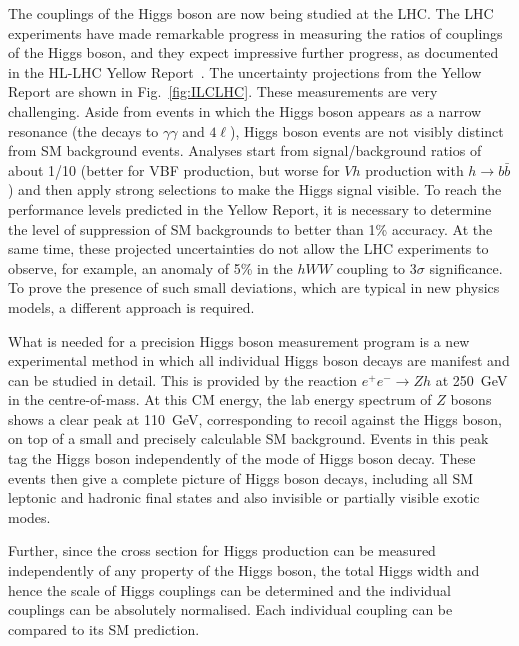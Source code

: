 \documentclass[%
 reprint,
 amsmath,amssymb,
 aps,
]{revtex4-1}
\def\ee{e^+e^-}
\begin{document}
The couplings of the Higgs boson are now being studied at the LHC.
The LHC experiments have made remarkable progress in measuring the ratios of
couplings of the Higgs boson, and they expect impressive further progress, as
documented in the HL-LHC Yellow Report~\cite{Yellow}.  The uncertainty
projections
from the Yellow Report  are shown in Fig.~\ref{fig:ILCLHC}.   These
measurements are very challenging.   Aside from events in
which the Higgs boson appears as a narrow resonance (the decays to
$\gamma\gamma$ and $4\ell$), Higgs boson events are not visibly
distinct from SM background events.  Analyses start from
signal/background ratios of about  1/10  (better for VBF production,
but 
worse for $Vh$ production with $h\to b\bar b$) and then apply strong
selections to make the Higgs signal visible.   To reach the
performance levels predicted in  the Yellow Report, it is necessary to
determine the level of suppression of SM backgrounds to better than
 1\% accuracy.  At
the same time, these projected uncertainties do not allow the LHC experiments to
observe, for example, an anomaly of 5\% in the $hWW$ coupling to
3$\sigma$ significance.   To prove the presence of such small
deviations, which are typical in new physics models, a
different approach is required. 

What is needed for a precision Higgs boson measurement program is a new experimental method in which all individual Higgs boson decays are manifest and can be studied in detail.   This is provided by the reaction
$\ee\to Zh$ at 250~GeV in the centre-of-mass. At this CM energy, the lab energy spectrum of $Z$ bosons shows a clear peak at 110~GeV, corresponding to recoil against the Higgs boson, on top of a small and precisely calculable SM background. Events in this peak tag the Higgs boson independently of the mode of Higgs boson decay. These events then give a complete picture of Higgs boson  decays, including all SM leptonic and hadronic final states and also invisible or partially visible exotic modes. 

  
Further, since the cross section for Higgs production can be measured
independently of any property of the Higgs boson, the total Higgs width and hence the scale of Higgs
couplings can be determined and the individual couplings can be
absolutely normalised.  Each individual coupling can be compared to
its SM prediction.
\end{document}
